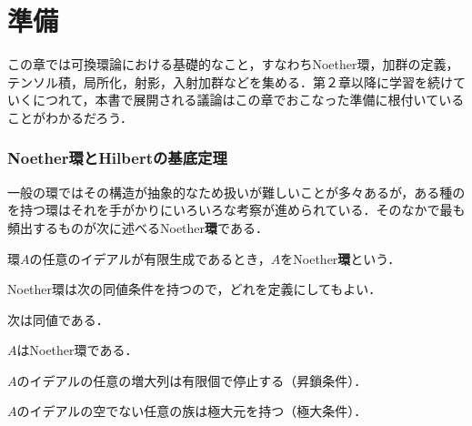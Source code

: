 \part[Preliminaries]{準備}
この章では可換環論における基礎的なこと，すなわちNoether環，加群の定義，テンソル積，局所化，射影，入射加群などを集める．第２章以降に学習を続けていくにつれて，本書で展開される議論はこの章でおこなった準備に根付いていることがわかるだろう．

\section{Noether環とHilbertの基底定理}

一般の環ではその構造が抽象的なため扱いが難しいことが多々あるが，ある種のを持つ環はそれを手がかりにいろいろな考察が進められている．そのなかで最も頻出するものが次に述べるNoether\textbf{環}である．

\begin{defi}[Noether環]\label{defi:Noether環}
	環$A$の任意のイデアルが有限生成であるとき，$A$をNoether\textbf{環}という．
\end{defi}

Noether環は次の同値条件を持つので，どれを定義にしてもよい．

\begin{prop}
	次は同値である．
	\begin{sakura}
		\item $A$はNoether環である．
		\item $A$のイデアルの任意の増大列は有限個で停止する（昇鎖条件）．
		\item $A$のイデアルの空でない任意の族は極大元を持つ（極大条件）．
	\end{sakura}
\end{prop}

